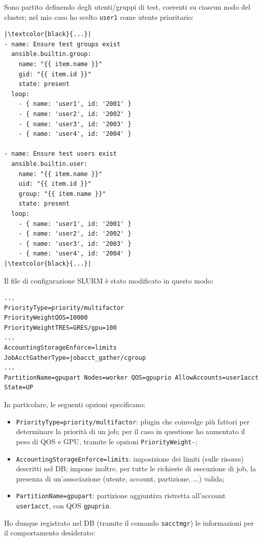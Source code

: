 \documentclass[12pt,a4paper,twoside,openright]{book}
\begin{document}
Sono partito definendo degli utenti/gruppi di test, coerenti su ciascun nodo del cluster; nel mio caso ho scelto \texttt{user1} come utente prioritario:
\begin{verbatim}
|\textcolor{black}{...}|
- name: Ensure test groups exist
  ansible.builtin.group:
    name: "{{ item.name }}"
    gid: "{{ item.id }}"
    state: present
  loop:
    - { name: 'user1', id: '2001' }
    - { name: 'user2', id: '2002' }
    - { name: 'user3', id: '2003' }
    - { name: 'user4', id: '2004' }

- name: Ensure test users exist
  ansible.builtin.user:
    name: "{{ item.name }}"
    uid: "{{ item.id }}"
    group: "{{ item.name }}"
    state: present
  loop:
    - { name: 'user1', id: '2001' }
    - { name: 'user2', id: '2002' }
    - { name: 'user3', id: '2003' }
    - { name: 'user4', id: '2004' }
|\textcolor{black}{...}|
\end{verbatim}
Il file di configurazione \ac{SLURM} è stato modificato in questo modo:
\begin{verbatim}
...
PriorityType=priority/multifactor
PriorityWeightQOS=10000
PriorityWeightTRES=GRES/gpu=100
...
AccountingStorageEnforce=limits
JobAcctGatherType=jobacct_gather/cgroup
...
PartitionName=gpupart Nodes=worker QOS=gpuprio AllowAccounts=user1acct State=UP
\end{verbatim}
In particolare, le seguenti opzioni specificano:
\begin{itemize}
    \item \texttt{PriorityType=priority/multifactor}: plugin che coinvolge più fattori per determinare la priorità di un job; per il caso in questione ho aumentato il peso di \ac{QOS} e \ac{GPU}, tramite le opzioni \texttt{PriorityWeight-};
    \item \texttt{AccountingStorageEnforce=limits}: imposizione dei limiti (sulle risorse) descritti nel \ac{DB}; impone inoltre, per tutte le richieste di esecuzione di job, la presenza di un'associazione (utente, account, partizione, ...) valida;
    \item \texttt{PartitionName=gpupart}: partizione aggiuntiva ristretta all'account \texttt{user1acct}, con \ac{QOS} \texttt{gpuprio}.
\end{itemize}
Ho dunque registrato nel \ac{DB} (tramite il comando \texttt{sacctmgr}) le informazioni per il comportamento desiderato:
\end{document}
